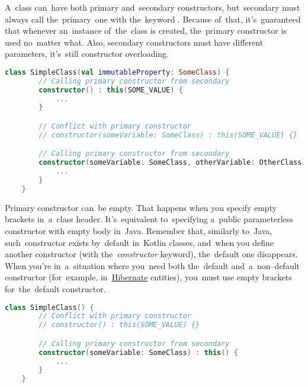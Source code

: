 \noindent A~class can~have both primary and~secondary constructors, but~secondary must always call the~primary~one with the~keyword .
Because of~that, it's~guaranteed that whenever an~instance of~the~class is created, the~primary constructor is used no~matter what.
Also, secondary constructors must have different parameters, it's~still constructor \mbox{overloading.}

\begin{lstlisting}[language=Kotlin]
    class SimpleClass(val immutableProperty: SomeClass) {
        // Calling primary constructor from secondary
        constructor() : this(SOME_VALUE) {
            ...
        }

        // Conflict with primary constructor
        // constructor(someVariable: SomeClass) : this(SOME_VALUE) {}

        // Calling primary constructor from secondary
        constructor(someVariable: SomeClass, otherVariable: OtherClass) : this(SOME_VALUE) {
            ...
        }
    }
\end{lstlisting}
\newline

\enlargethispage{10mm}
\thispagestyle{empty}
\noindent Primary constructor can~be empty.
That happens when you specify empty brackets in~a~class header.
It's~equivalent to~specifying a~public parameterless constructor with empty body in~Java.
Remember that, similarly to~Java, such~constructor exists by~default in~Kotlin classes, and~when you define another constructor (with the~\textit{constructor} keyword), the~default one disappears.
When you're in~a~situation where you~need both the~default and~a~non--default constructor (for~example, in~\hyperref[hibernate]{Hibernate} entities), you~must use empty brackets for~the~default constructor.
\newpage

\begin{lstlisting}[language=Kotlin]
    class SimpleClass() {
        // Conflict with primary constructor
        // constructor() : this(SOME_VALUE) {}

        // Calling primary constructor from secondary
        constructor(someVariable: SomeClass) : this() {
            ...
        }
    }
\end{lstlisting}

